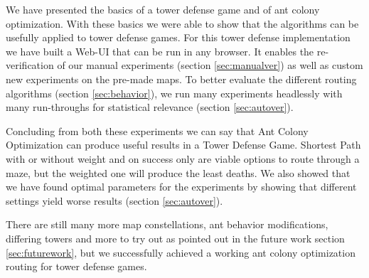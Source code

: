 We have presented the basics of a tower defense game and of ant colony optimization. With these basics we were able to show that the algorithms can be usefully applied to tower defense games.
For this tower defense implementation we have built a Web-UI that can be run in any browser. It enables the re-verification of our manual experiments (section \ref{sec:manualver}) as well as custom new experiments on the pre-made maps.
To better evaluate the different routing algorithms (section \ref{sec:behavior}), we run many experiments headlessly with many run-throughs for statistical relevance (section \ref{sec:autover}).

Concluding from both these experiments we can say that Ant Colony Optimization can produce useful results in a Tower Defense Game. Shortest Path with or without weight and on success only are viable options to route through a maze, but the weighted one will produce the least deaths. We also showed that we have found optimal parameters for the experiments by showing that different settings yield worse results (section \ref{sec:autover}).

There are still many more map constellations, ant behavior modifications, differing towers and more to try out as pointed out in the future work section \ref{sec:futurework}, but we successfully achieved a working ant colony optimization routing for tower defense games.